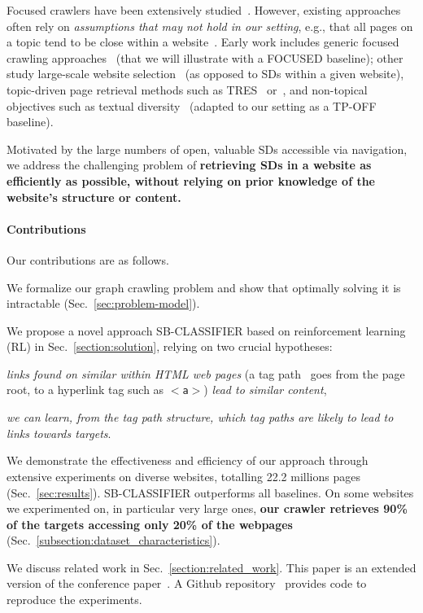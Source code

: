 Focused crawlers have been extensively
studied~\cite{chakrabarti1999focused,diligenti2000focused,gouriten2014scalable,meusel2014focused,faheem2015adaptive,han2018focused,kontogiannis2022tree}.
However, existing approaches often rely on \emph{assumptions that may not
hold in our setting}, e.g., that all pages on a
topic tend to be close within a website~\cite{10.1145/345508.345597}.
Early work includes generic focused crawling
approaches~\cite{chakrabarti1999focused,diligenti2000focused} (that we
will illustrate with a \textsf{\small FOCUSED} baseline); other study
large-scale website selection~\cite{meusel2014focused} (as opposed to SDs
within a given website), topic-driven page retrieval methods such as
\textsf{\small TRES}~\cite{kontogiannis2022tree}
or~\cite{chakrabarti1999focused,gouriten2014scalable,han2018focused}, and
non-topical objectives such as textual
diversity~\cite{faheem2015adaptive} (adapted to our setting
as a \textsf{\small TP-OFF} baseline).

Motivated by the large numbers of open, valuable SDs accessible
via navigation, we address the challenging problem of
\textbf{retrieving SDs in a website  as efficiently as possible, 
without relying on prior knowledge of the website's structure or content.}

\setlength{\fboxsep}{2pt}
\paragraph*{Contributions} Our contributions are as follows. \begin{inparaenum}[(1)]
	\noindent\item We formalize
	our graph crawling problem and show that optimally solving it is
	intractable (Sec.~\ref{sec:problem-model}).
	\noindent\item We propose a novel approach \textsf{\small SB-CLASSIFIER} based on
		reinforcement learning (RL) in Sec.~\ref{section:solution}, relying on two crucial  hypotheses: \begin{inparaenum}[(i)]
		\item 
		\emph{links found on similar  within HTML web pages} (a tag path~\cite{miao2009extracting, furche2012turn} goes from the page root, to a hyperlink tag such as \texttt{\small $<$a$>$}) \emph{lead to similar content},
		\item \emph{we can learn, from the tag path structure, which
			tag paths are likely to lead to links towards targets}.
	\end{inparaenum}
	\noindent\item We demonstrate the effectiveness and efficiency of our approach
	through extensive experiments on diverse
		websites, totalling 22.2 millions pages (Sec.~\ref{sec:results}). \textsf{\small SB-CLASSIFIER} outperforms all baselines.
	On some websites we experimented on, in particular very large ones,
	\textbf{our crawler retrieves 90\% of the targets  accessing only 20\% of the
		webpages} (Sec.~\ref{subsection:dataset_characteristics}).
\end{inparaenum}

We discuss related work in
Sec.~\ref{section:related_work}. This paper is an extended version of the conference paper~\cite{gauquier2026efficient2}. A Github repository~\cite{github_repository} provides code to reproduce the experiments. 
